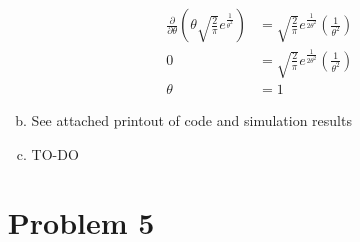 \documentclass[11pt]{article}
\begin{document}
\begin{enumerate}[(a)]
\begin{enumerate}[(a)]
\begin{align*}
      \frac{\partial}{\partial \theta} \left( \theta
      \sqrt{\frac{2}{\pi}} e^{\frac{1}{\theta^2}}\right) &= \sqrt{\frac{2}{\pi}}
                                                           e^{\frac{1}{2\theta^2}}
                                                           \left(
                                                           \frac{1}{\theta^2}
                                                           \right) \\
      0 &= \sqrt{\frac{2}{\pi}} e^{\frac{1}{2\theta^2}} \left(
          \frac{1}{\theta^2} \right) \\
      \theta &= 1
    \end{align*}
\newpage
  \item See attached printout of code and simulation results
\newpage

  \item TO-DO

\end{enumerate}

\section*{Problem 5}


\end{enumerate}
\end{document}
